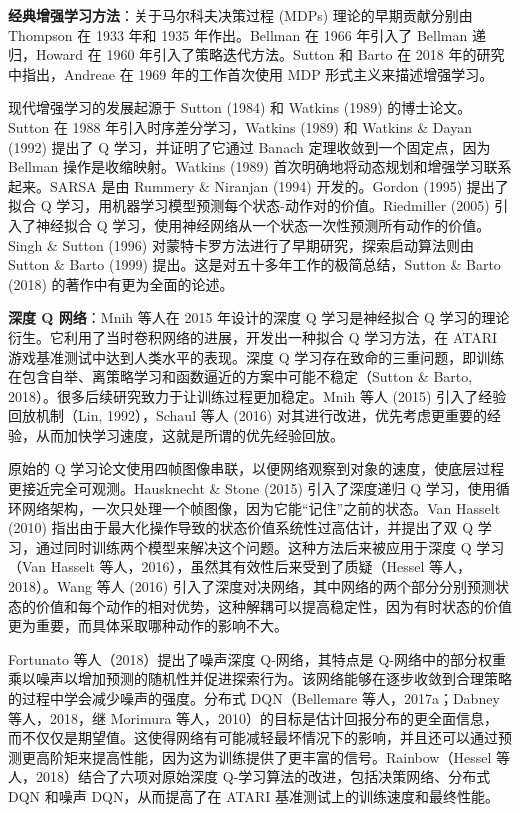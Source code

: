 \documentclass[lang=cn,newtx,10pt,scheme=chinese]{elegantbook}
\begin{document}
\textbf{经典增强学习方法}：关于马尔科夫决策过程 (MDPs) 理论的早期贡献分别由 Thompson 在 1933 年和 1935 年作出。Bellman 在 1966 年引入了 Bellman 递归，Howard 在 1960 年引入了策略迭代方法。Sutton 和 Barto 在 2018 年的研究中指出，Andreae 在 1969 年的工作首次使用 MDP 形式主义来描述增强学习。

现代增强学习的发展起源于 Sutton (1984) 和 Watkins (1989) 的博士论文。Sutton 在 1988 年引入时序差分学习，Watkins (1989) 和 Watkins \& Dayan (1992) 提出了 Q 学习，并证明了它通过 Banach 定理收敛到一个固定点，因为 Bellman 操作是收缩映射。Watkins (1989) 首次明确地将动态规划和增强学习联系起来。SARSA 是由 Rummery \& Niranjan (1994) 开发的。Gordon (1995) 提出了拟合 Q 学习，用机器学习模型预测每个状态-动作对的价值。Riedmiller (2005) 引入了神经拟合 Q 学习，使用神经网络从一个状态一次性预测所有动作的价值。Singh \& Sutton (1996) 对蒙特卡罗方法进行了早期研究，探索启动算法则由 Sutton \& Barto (1999) 提出。这是对五十多年工作的极简总结，Sutton \& Barto (2018) 的著作中有更为全面的论述。

\textbf{深度 Q 网络}：Mnih 等人在 2015 年设计的深度 Q 学习是神经拟合 Q 学习的理论衍生。它利用了当时卷积网络的进展，开发出一种拟合 Q 学习方法，在 ATARI 游戏基准测试中达到人类水平的表现。深度 Q 学习存在致命的三重问题，即训练在包含自举、离策略学习和函数逼近的方案中可能不稳定（Sutton \& Barto, 2018）。很多后续研究致力于让训练过程更加稳定。Mnih 等人 (2015) 引入了经验回放机制（Lin, 1992），Schaul 等人 (2016) 对其进行改进，优先考虑更重要的经验，从而加快学习速度，这就是所谓的优先经验回放。

原始的 Q 学习论文使用四帧图像串联，以便网络观察到对象的速度，使底层过程更接近完全可观测。Hausknecht \& Stone (2015) 引入了深度递归 Q 学习，使用循环网络架构，一次只处理一个帧图像，因为它能“记住”之前的状态。Van Hasselt (2010) 指出由于最大化操作导致的状态价值系统性过高估计，并提出了双 Q 学习，通过同时训练两个模型来解决这个问题。这种方法后来被应用于深度 Q 学习（Van Hasselt 等人，2016），虽然其有效性后来受到了质疑（Hessel 等人，2018）。Wang 等人 (2016) 引入了深度对决网络，其中网络的两个部分分别预测状态的价值和每个动作的相对优势，这种解耦可以提高稳定性，因为有时状态的价值更为重要，而具体采取哪种动作的影响不大。

Fortunato 等人（2018）提出了噪声深度 Q-网络，其特点是 Q-网络中的部分权重乘以噪声以增加预测的随机性并促进探索行为。该网络能够在逐步收敛到合理策略的过程中学会减少噪声的强度。分布式 DQN（Bellemare 等人，2017a；Dabney 等人，2018，继 Morimura 等人，2010）的目标是估计回报分布的更全面信息，而不仅仅是期望值。这使得网络有可能减轻最坏情况下的影响，并且还可以通过预测更高阶矩来提高性能，因为这为训练提供了更丰富的信号。Rainbow（Hessel 等人，2018）结合了六项对原始深度 Q-学习算法的改进，包括决策网络、分布式 DQN 和噪声 DQN，从而提高了在 ATARI 基准测试上的训练速度和最终性能。
\end{document}
